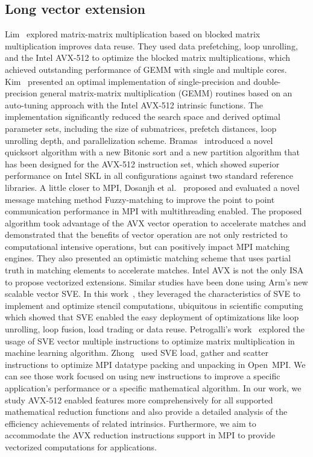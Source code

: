 \documentclass[5p,times,twocolumn]{elsarticle}
\newcommand{\ompi}[0]{Open~MPI\xspace}
\newcommand{\sve}[0]{\textsc{SVE}\xspace}
\begin{document}
\subsection{Long vector extension}
Lim~\cite{Lim2018} explored matrix-matrix multiplication based on blocked matrix multiplication
improves data reuse. They used data prefetching, loop unrolling, and the Intel AVX-512
to optimize the blocked matrix multiplications, which achieved outstanding performance of GEMM
with single and multiple cores.
%
Kim~\cite{Kim19} presented an optimal implementation of single-precision and double-precision general matrix-matrix multiplication (GEMM) routines based on an auto-tuning approach with the Intel AVX-512 intrinsic functions.
The implementation significantly reduced the search space and derived optimal parameter sets, including the size of submatrices, prefetch distances, loop unrolling depth, and parallelization scheme.
%
Bramas~\cite{Bramas2017} introduced a novel quicksort algorithm with a new Bitonic sort and a new
partition algorithm that has been designed for the AVX-512
instruction set, which showed superior performance on Intel SKL in
all configurations against two standard reference libraries.
%
A little closer to MPI, Dosanjh et al.~\cite{tag-match} proposed and evaluated a novel message matching method Fuzzy-matching
to improve the point to point communication performance in MPI with multithreading enabled.
The proposed algorithm took advantage of the AVX vector operation to accelerate matches
and demonstrated that the benefits of vector operation are not only restricted to computational intensive operations, but can positively impact MPI matching engines. They also presented an optimistic
matching scheme that uses partial truth in matching elements
to accelerate matches.
%
Intel AVX is not the only ISA to propose vectorized extensions. Similar studies have been done using Arm's new scalable vector SVE.
In this work~\cite{sve-stencil}, they leveraged the characteristics of \sve to implement and optimize
stencil computations, ubiquitous in scientific computing which showed
that \sve enabled the easy deployment of optimizations like loop unrolling,
loop fusion, load trading or data reuse.
%
Petrogalli's work~\cite{sveml} explored the usage of SVE vector multiple
instructions to optimize matrix multiplication in machine learning algorithm.
%
Zhong~\cite{dongsve} used SVE load, gather and scatter instructions to optimize MPI datatype
packing and unpacking in \ompi.
%
We can see those work focused on using new instructions to improve a specific application's performance or a specific mathematical algorithm.
In our work, we study AVX-512 enabled features more comprehensively for
all supported mathematical reduction functions and also provide
a detailed analysis of the efficiency achievements of related intrinsics.
Furthermore, we aim to accommodate the AVX reduction instructions support in MPI to provide
vectorized computations for applications.
\end{document}
